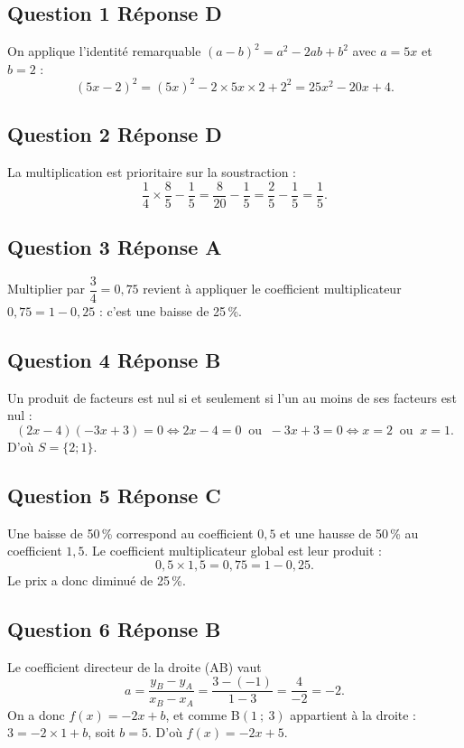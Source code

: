 \subsection*{Question 1 \quad Réponse D}

On applique l'identité remarquable $(a-b)^2 = a^2 - 2ab + b^2$ avec $a = 5x$ et $b = 2$ :
\[(5x-2)^2 = (5x)^2 - 2\times 5x\times 2 + 2^2 = 25x^2 - 20x + 4.\]

\subsection*{Question 2 \quad Réponse D}

La multiplication est prioritaire sur la soustraction :
\[\dfrac{1}{4}\times\dfrac{8}{5} - \dfrac{1}{5} = \dfrac{8}{20} - \dfrac{1}{5} = \dfrac{2}{5} - \dfrac{1}{5} = \dfrac{1}{5}.\]

\subsection*{Question 3 \quad Réponse A}

Multiplier par $\dfrac{3}{4} = 0,75$ revient à appliquer le coefficient multiplicateur
$0,75 = 1 - 0,25$ : c'est une baisse de 25\,\%.

\subsection*{Question 4 \quad Réponse B}

Un produit de facteurs est nul si et seulement si l'un au moins de ses facteurs est nul :
\[(2x-4)(-3x+3) = 0 \iff 2x - 4 = 0 \ \text{ ou } \ -3x + 3 = 0 \iff x = 2 \ \text{ ou } \ x = 1.\]
D'où $S = \{2 ; 1\}$.

\subsection*{Question 5 \quad Réponse C}

Une baisse de 50\,\% correspond au coefficient $0,5$ et une hausse de 50\,\% au
coefficient $1,5$. Le coefficient multiplicateur global est leur produit :
\[0,5 \times 1,5 = 0,75 = 1 - 0,25.\]
Le prix a donc diminué de 25\,\%.

\subsection*{Question 6 \quad Réponse B}

Le coefficient directeur de la droite (AB) vaut
\[a = \dfrac{y_B - y_A}{x_B - x_A} = \dfrac{3 - (-1)}{1 - 3} = \dfrac{4}{-2} = -2.\]
On a donc $f(x) = -2x + b$, et comme B$(1~;~3)$ appartient à la droite :
$3 = -2\times 1 + b$, soit $b = 5$. D'où $f(x) = -2x + 5$.

